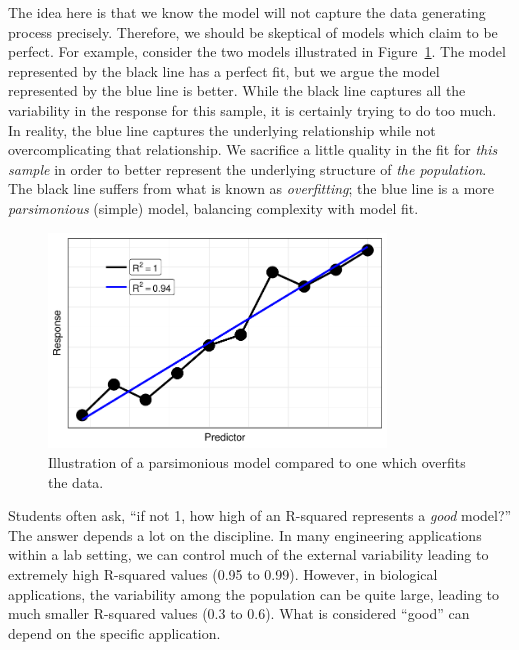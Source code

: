 \documentclass[
  letterpaper,
  DIV=11,
  numbers=noendperiod]{scrreprt}
\theoremstyle{plain}
\theoremstyle{definition}
\theoremstyle{definition}
\theoremstyle{remark}
\begin{document}
The idea here is that we know the model will not capture the data
generating process precisely. Therefore, we should be skeptical of
models which claim to be perfect. For example, consider the two models
illustrated in Figure~\ref{fig-regquality-overfit}. The model
represented by the black line has a perfect fit, but we argue the model
represented by the blue line is better. While the black line captures
all the variability in the response for this sample, it is certainly
trying to do too much. In reality, the blue line captures the underlying
relationship while not overcomplicating that relationship. We sacrifice
a little quality in the fit for \emph{this sample} in order to better
represent the underlying structure of \emph{the population}. The black
line suffers from what is known as \emph{overfitting}; the blue line is
a more \emph{parsimonious} (simple) model, balancing complexity with
model fit.

\begin{figure}

{\centering \includegraphics[width=0.8\textwidth,height=\textheight]{./images/fig-regquality-overfit-1.pdf}

}

\caption{\label{fig-regquality-overfit}Illustration of a parsimonious
model compared to one which overfits the data.}

\end{figure}

Students often ask, ``if not 1, how high of an R-squared represents a
\emph{good} model?'' The answer depends a lot on the discipline. In many
engineering applications within a lab setting, we can control much of
the external variability leading to extremely high R-squared values
(0.95 to 0.99). However, in biological applications, the variability
among the population can be quite large, leading to much smaller
R-squared values (0.3 to 0.6). What is considered ``good'' can depend on
the specific application.
\end{document}
